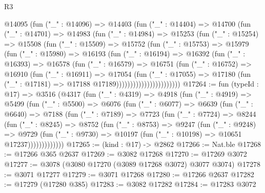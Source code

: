 \begin{lexlean}{R3}
\begin{coremodule}
                  @14095
                    (fun ("_" : @14096) =>
                    @14403
                      (fun ("_" : @14404) =>
                      @14700
                        (fun ("_" : @14701) =>
                        @14983
                          (fun ("_" : @14984) =>
                          @15253
                            (fun ("_" : @15254) =>
                            @15508
                              (fun ("_" : @15509) =>
                              @15752
                                (fun ("_" : @15753) =>
                                @15979
                                  (fun ("_" : @15980) =>
                                  @16193
                                    (fun ("_" : @16194) =>
                                    @16392
                                      (fun ("_" : @16393) =>
                                      @16578
                                        (fun ("_" : @16579) =>
                                        @16751
                                          (fun ("_" : @16752) =>
                                          @16910
                                            (fun ("_" : @16911) =>
                                            @17054
                                              (fun ("_" : @17055) =>
                                              @17180
                                                (fun ("_" : @17181) =>
                                                @17188 @17189)))))))))))))))))))))))
@17264 := fun (typeId : @17) =>
  @3516
    (@4317
      (fun ("_" : @4319) =>
      @4918
        (fun ("_" : @4919) =>
        @5499
          (fun ("_" : @5500) =>
          @6076
            (fun ("_" : @6077) =>
            @6639
              (fun ("_" : @6640) =>
              @7188
                (fun ("_" : @7189) =>
                @7723
                  (fun ("_" : @7724) =>
                  @8244
                    (fun ("_" : @8245) =>
                    @8752
                      (fun ("_" : @8753) =>
                      @9247
                        (fun ("_" : @9248) =>
                        @9729
                          (fun ("_" : @9730) =>
                          @10197 (fun ("_" : @10198) => @10651 @17237)))))))))))))
@17265 := (kind : @17) -> @2862
@17266 := Nat.ble
@17268 := @17266 @365 @2637
@17269 := @3082 @17268
@17270 := @17269 @3072
@17277 := @3078 (@3080 @17270 (@3089 @17268 @3072) @3077 @3074)
@17278 := @3071 @17277
@17279 := @3071 @17268
@17280 := @17266 @2637
@17282 := @17279 (@17280 @385)
@17283 := @3082 @17282
@17284 := @17283 @3072

\end{coremodule}
\end{lexlean}
